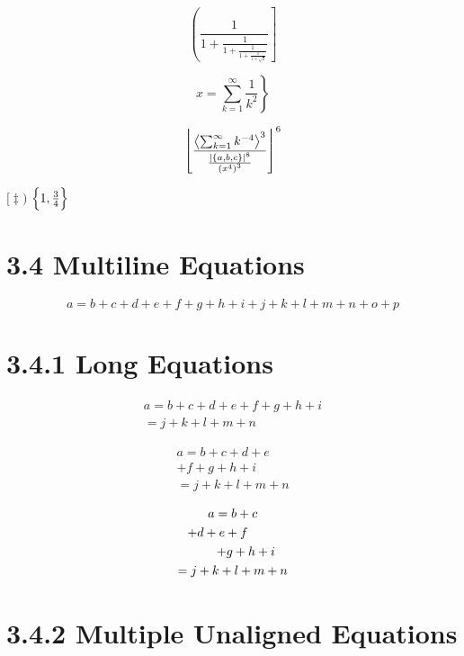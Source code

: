 \documentclass{article}
\begin{document}
\[
\left(
  \frac{1}{1 + 
   \frac{1}{1 + 
    \frac{1}{1 + 
     \frac{1}{1 + 
      \sqrt{2}}}}}
\right]
\]

\[
x = \left.
      \sum_{k=1}^{\infty}
       \frac{1}{k^2}
    \right\}
\]

\DeclarePairedDelimiter{\set}{\{}{\}}
\DeclarePairedDelimiter{\size}{\lvert}{\rvert}
\DeclarePairedDelimiter{\mean}{\langle}{\rangle}
\DeclarePairedDelimiter{\floor}{\lfloor}{\rfloor}
\DeclarePairedDelimiter{\group}{(}{)}

\[
\floor*{
 \frac
  {\mean*{\sum_{k=1}^{\infty} k^{-4}}^3}
  {\frac{\size*{\set{a,b,c}}^8}{\group*{x^4}^3}}
 }^6
\]

\DeclarePairedDelimiter{%
\setAgain}{\{}{\}}
\( \bigl[ \ddagger \Biggr) \)
\( \setAgain[\Big]{1,\frac{3}{4}} \)


\section{3.4 Multiline Equations}

\begin{equation}
  a = b + c + d + e + f
  + g + h + i + j
  + k + l + m + n + o + p
\end{equation}

\section{3.4.1 Long Equations}

\begin{multline}
  a = b + c + d + e 
  + f + g + h + i \\
  = j + k + l + m + n
\end{multline}

\begin{multline}
  a = b + c + d + e \\ 
  + f + g + h + i \\
  = j + k + l + m + n
\end{multline}

\begin{multline}
  a = b + c \\
  \shoveleft{+ d + e + f} \\
  \shoveright{+ g + h + i} \\
  = j + k + l + m + n
\end{multline}

\section{3.4.2 Multiple Unaligned Equations}
\end{document}
